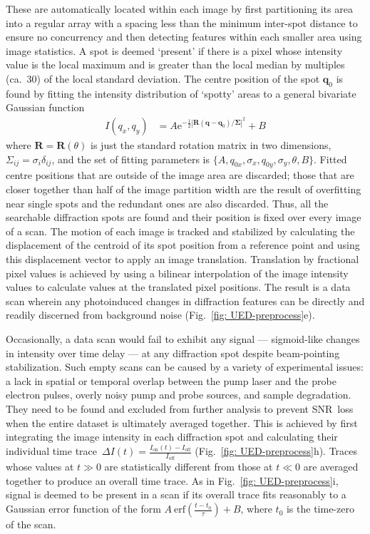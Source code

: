 These are automatically located within each image by first partitioning its area
into a regular array with a spacing less than the minimum inter-spot distance to ensure no concurrency
and then detecting features within each smaller area using image statistics.
A spot is deemed `present' if there is a pixel whose intensity value is the local maximum
and is greater than the local median by multiples (ca.~$30$) of the local standard deviation.
The centre position of the spot $\boldsymbol{q}_0$ is found by fitting
the intensity distribution of `spotty' areas to a general bivariate Gaussian function
%
\begin{equation}
  \begin{aligned}
      I(q_x, q_y)
        & = A \text{e}^{-\frac{1}{2}\left\lvert \mathbf{R} \left( \boldsymbol{q} - \boldsymbol{q}_0 \right)/\mathbf{\Sigma} \right\rvert^2} + B
  \end{aligned}
  \label{eq: gaussian-spot}
\end{equation}
%
where $\mathbf{R} = \mathbf{R}(\theta)$ is just the standard rotation matrix in two dimensions,
$\Sigma_{ij} = \sigma_i \delta_{ij}$, and
the set of fitting parameters is $\{ A, q_{0x}, \sigma_x, q_{0y}, \sigma_y, \theta, B \}$.
%
Fitted centre positions that are outside of the image area are discarded;
those that are closer together than half of the image partition width
are the result of overfitting near single spots and the redundant ones are also discarded.
%
Thus, all the searchable diffraction spots are found and their position is fixed over
every image of a scan.
%
The motion of each image is tracked and stabilized
by calculating the displacement of the centroid of its spot position from a reference point
and using this displacement vector to apply an image translation.
Translation by fractional pixel values is achieved by using a bilinear interpolation
of the image intensity values to calculate values at the translated pixel positions.
The result is a data scan wherein any photoinduced changes in diffraction features
can be directly and readily discerned from background noise (Fig.~\ref{fig: UED-preprocess}e).

Occasionally, a data scan would fail to exhibit any signal --- sigmoid-like changes in intensity
over time delay --- at any diffraction spot despite beam-pointing stabilization.
Such empty scans can be caused by a variety of experimental issues: a lack in spatial or temporal overlap
between the pump laser and the probe electron pulses, overly noisy pump and probe sources,
and sample degradation.
They need to be found and excluded from further analysis
to prevent SNR~loss when the entire dataset is ultimately averaged together.
%
This is achieved by first integrating the image intensity in each diffraction spot
and calculating their individual time trace~$\Delta I(t) = \frac{I_\text{on}(t) - I_\text{off}}{I_\text{off}}$
(Fig.~\ref{fig: UED-preprocess}h).
Traces whose values at $t \gg 0$ are statistically different from
those at $t \ll 0$ are averaged together to produce an overall time trace.
As in Fig.~\ref{fig: UED-preprocess}i,
signal is deemed to be present in a scan if its overall trace fits reasonably to
a Gaussian error function of the form $A \: \text{erf}\left(\frac{t-t_0}{\tau}\right) + B$,
where $t_0$ is the time-zero of the scan.

